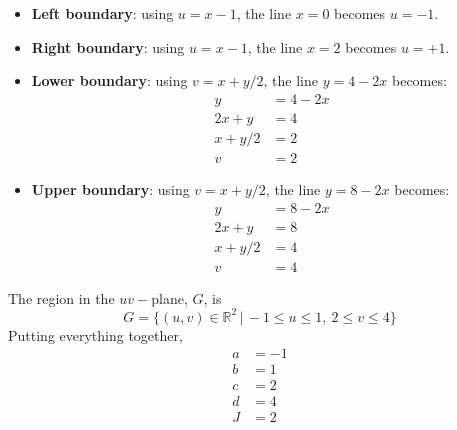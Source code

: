 {    \begin{itemize}
        \item \textbf{Left boundary}: using $u = x -1$, the line $x=0$ becomes $u=-1$. 
        \item \textbf{Right boundary}: using $u = x -1$, the line $x=2$ becomes $u=+1$. 
        \item \textbf{Lower boundary}: using $v = x+y/2$, the line $y = 4-2x$ becomes:
        \begin{align}
            y &= 4 - 2x \\
            2x + y & = 4 \\
            x + y/2 &= 2 \\
            v &= 2
        \end{align}
        \item \textbf{Upper boundary}: using $v = x+y/2$, the line $y = 8-2x$ becomes:
        \begin{align}
            y &= 8 - 2x \\
            2x + y & = 8 \\
            x + y/2 &= 4 \\
            v &= 4
        \end{align}
    \end{itemize}
    The region in the $uv-$plane, $G$, is 
    $$G = \{(u,v) \in \mathbb R^2 \, | \, -1 \le u \le 1, \ 2 \le v \le 4 \}$$
    Putting everything together, 
    \begin{align}
        a & = -1 \\
        b &= 1 \\
        c &= 2 \\
        d &= 4 \\
        J &= 2
    \end{align}
    
}

